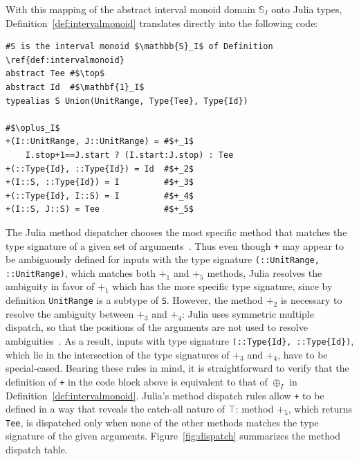 \documentclass{sig-alternate}
\newcommand{\code}[1]{\texttt{#1}}
\begin{document}
With this mapping of the abstract interval monoid domain $\mathbb S_I$ onto
Julia types, Definition~\ref{def:intervalmonoid} translates directly into the
following code:

\begin{verbatim}
#S is the interval monoid $\mathbb{S}_I$ of Definition \ref{def:intervalmonoid}
abstract Tee #$\top$
abstract Id  #$\mathbf{1}_I$
typealias S Union(UnitRange, Type{Tee}, Type{Id})

#$\oplus_I$
+(I::UnitRange, J::UnitRange) = #$+_1$ 
    I.stop+1==J.start ? (I.start:J.stop) : Tee
+(::Type{Id}, ::Type{Id}) = Id  #$+_2$
+(I::S, ::Type{Id}) = I         #$+_3$
+(::Type{Id}, I::S) = I         #$+_4$
+(I::S, J::S) = Tee             #$+_5$
\end{verbatim}

The Julia method dispatcher chooses the most specific method that matches the
type signature of a given set of arguments~\cite{Bezanson2012}. Thus even
though \code{+} may appear to be ambiguously defined for inputs with the type
signature \code{(::Unit\-Range, ::UnitRange)}, which matches both $+_1$ and $+_5$
methods, Julia resolves the ambiguity in favor of $+_1$ which has the more
specific type signature, since by definition \code{UnitRange} is a subtype of
\code{S}. However, the method $+_2$ is necessary to resolve the ambiguity
between $+_3$ and $+_4$: Julia uses symmetric multiple dispatch, so that the
positions of the arguments are not used to resolve
ambiguities~\cite{Bezanson2012}. As a result, inputs with type signature
\code{(::Type\{Id\}, ::Type\{Id\})}, which lie in the intersection of the type
signatures of $+_3$ and $+_4$, have to be special-cased. Bearing these rules in
mind, it is straightforward to verify that the definition of \code{+} in the
code block above is equivalent to that of $\oplus_I$ in
Definition~\ref{def:intervalmonoid}. Julia's method dispatch rules allow
\code{+} to be defined in a way that reveals the catch-all nature of $\top$:
method $+_5$, which returns \code{Tee}, is dispatched only when none of the
other methods matches the type signature of the given arguments.
Figure~\ref{fig:dispatch} summarizes the method dispatch table.
\end{document}
